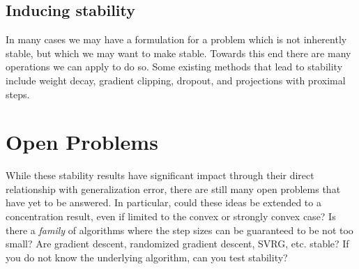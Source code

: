 \documentclass[12pt]{report}
\begin{document}
\subsection{Inducing stability}
In many cases we may have a formulation for a problem which is not inherently stable, but which we may want to make stable. Towards this end there are many operations we can apply to do so. Some existing methods that lead to stability include weight decay, gradient clipping, dropout, and projections with proximal steps.

\section{Open Problems}
While these stability results have significant impact through their direct relationship with generalization error, there are still many open problems that have yet to be answered. In particular, could these ideas be extended to a concentration result, even if limited to the convex or strongly convex case? Is there a \textit{family} of algorithms where the step sizes can be guaranteed to be not too small? Are gradient descent, randomized gradient descent, SVRG, etc. stable? If you do not know the underlying algorithm, can you test stability?



\end{document}
